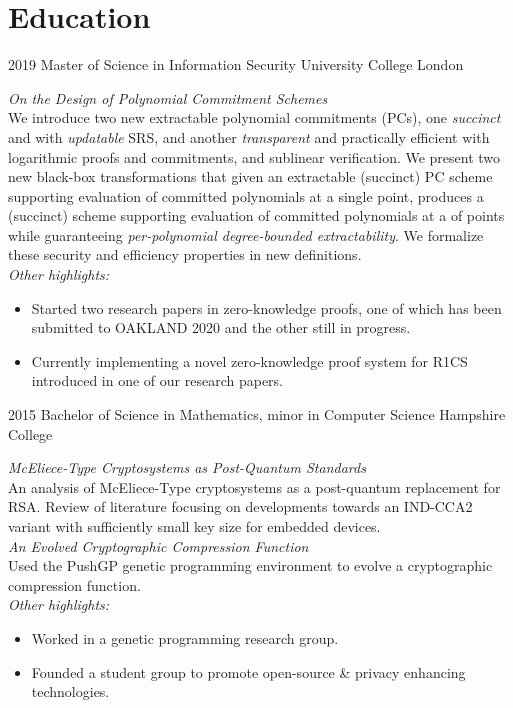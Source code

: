 \documentclass[]{fowlslegs-cv}
\newcommand\makeIcon[1]{%
    \raisebox{-1pt}{%
        \texttt{[image: icons/\#1]}%
    }%
}
\begin{document}
\section{Education}
\begin{entrylist}
\entry
{2019}
{\makeIcon{diploma} Master of Science {\normalfont\footnotesize in Information Security}}
{}
{University College London}
{\emph{On the Design of Polynomial Commitment Schemes}\\
  We introduce two new extractable polynomial commitments (PCs), one \emph{succinct} and with \emph{updatable} SRS, and another \emph{transparent} and practically efficient with logarithmic proofs and commitments, and sublinear verification. We present two new black-box transformations that given an extractable (succinct) PC scheme supporting evaluation of committed polynomials at a single point, produces a (succinct) scheme supporting evaluation of committed polynomials at a  of points while guaranteeing \emph{per-polynomial degree-bounded extractability}. We formalize these security and efficiency properties in new definitions. \vspace{1mm}\\

  \emph{Other highlights:}
  \begin{itemize}
    \item Started two research papers in zero-knowledge proofs, one of which has been submitted to OAKLAND 2020 and the other still in progress.
    \item Currently implementing a novel zero-knowledge proof system for R1CS introduced in one of our research papers.
  \end{itemize}
}
\entry
{2015}
{\makeIcon{diploma} Bachelor of Science {\normalfont\footnotesize in Mathematics, minor in Computer Science}}
{}
{Hampshire College}
{\emph{McEliece-Type Cryptosystems as Post-Quantum Standards}\\
  An analysis of McEliece-Type cryptosystems as a post-quantum replacement for
  RSA. Review of literature focusing on developments towards an IND-CCA2 variant
  with sufficiently small key size for embedded devices. \vspace{1mm}\\
  \emph{An Evolved Cryptographic Compression Function}\\
  Used the PushGP genetic programming environment to evolve a cryptographic
  compression function. \vspace{1mm}\\
  \emph{Other highlights:}
  \begin{itemize}
    \item Worked in a genetic programming research group.
    \item Founded a student group to promote open-source \& privacy enhancing technologies.
\end{itemize}}
\end{entrylist}
\end{document}
